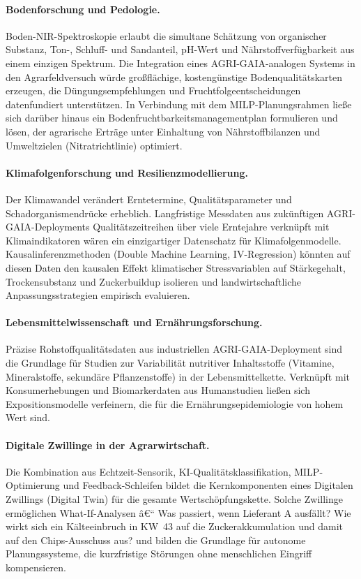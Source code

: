 \documentclass[a4paper, 12pt, twoside, openright]{report}
\theoremstyle{definition}
\theoremstyle{definition}
\begin{document}
\paragraph{Bodenforschung und Pedologie.}
Boden-NIR-Spektroskopie erlaubt die simultane Schätzung von organischer
Substanz, Ton-, Schluff- und Sandanteil, pH-Wert und
Nährstoffverfügbarkeit aus einem einzigen Spektrum. Die Integration
eines AGRI-GAIA-analogen Systems in den Agrarfeldversuch würde
großflächige, kostengünstige Bodenqualitätskarten erzeugen, die
Düngungsempfehlungen und Fruchtfolgeentscheidungen datenfundiert
unterstützen. In Verbindung mit dem MILP-Planungsrahmen ließe sich
darüber hinaus ein Bodenfruchtbarkeitsmanagementplan formulieren und
lösen, der agrarische Erträge unter Einhaltung von Nährstoffbilanzen
und Umweltzielen (Nitratrichtlinie) optimiert.

\paragraph{Klimafolgenforschung und Resilienzmodellierung.}
Der Klimawandel verändert Erntetermine, Qualitätsparameter und
Schadorganismendrücke erheblich. Langfristige Messdaten aus zukünftigen
AGRI-GAIA-Deployments Qualitätszeitreihen über viele Erntejahre
verknüpft mit Klimaindikatoren wären ein einzigartiger Datenschatz
für Klimafolgenmodelle. Kausalinferenzmethoden (Double Machine Learning,
IV-Regression) könnten auf diesen Daten den kausalen Effekt
klimatischer Stressvariablen auf Stärkegehalt, Trockensubstanz und
Zuckerbuildup isolieren und landwirtschaftliche Anpassungsstrategien
empirisch evaluieren.

\paragraph{Lebensmittelwissenschaft und Ernährungsforschung.}
Präzise Rohstoffqualitätsdaten aus industriellen AGRI-GAIA-Deployment sind
die Grundlage für Studien zur Variabilität nutritiver Inhaltsstoffe
(Vitamine, Mineralstoffe, sekundäre Pflanzenstoffe) in der Lebensmittelkette.
Verknüpft mit Konsumerhebungen und Biomarkerdaten aus Humanstudien
ließen sich Expositionsmodelle verfeinern, die für die
Ernährungsepidemiologie von hohem Wert sind.

\paragraph{Digitale Zwillinge in der Agrarwirtschaft.}
Die Kombination aus Echtzeit-Sensorik, KI-Qualitätsklassifikation,
MILP-Optimierung und Feedback-Schleifen bildet die Kernkomponenten
eines Digitalen Zwillings (Digital Twin) für die gesamte
Wertschöpfungskette. Solche Zwillinge ermöglichen What-If-Analysen â€“
Was passiert, wenn Lieferant A ausfällt? Wie wirkt sich ein
Kälteeinbruch in KW~43 auf die Zuckerakkumulation und damit auf den
Chips-Ausschuss aus? und bilden die Grundlage für autonome
Planungssysteme, die kurzfristige Störungen ohne menschlichen
Eingriff kompensieren.
\end{document}
